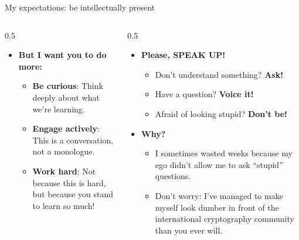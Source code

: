 \ifdefined\PRESENTATION\else\PassOptionsToClass{handout}{beamer}\fi\documentclass[aspectratio=169, lualatex]{beamer}
\begin{document}
\begin{frame}{My expectations: be intellectually present}
	\begin{columns}[c]
		\begin{column}{0.5\textwidth}
			\begin{itemize}
				\item \textbf{But I want you to do more:}
				      \begin{itemize}[<+->]
					      \item \textbf{Be curious}: Think deeply about what we're learning.
					      \item \textbf{Engage actively}: This is a conversation, not a monologue.
					      \item \textbf{Work hard}: Not because this is hard, but because you stand to learn so much!
				      \end{itemize}
			\end{itemize}
		\end{column}
		\begin{column}{0.5\textwidth}
			\begin{itemize}
				\item \textbf{Please, SPEAK UP!}
				      \begin{itemize}[<+->]
					      \item Don't understand something? \textbf{Ask!}
					      \item Have a question? \textbf{Voice it!}
					      \item Afraid of looking stupid? \textbf{Don't be!}
				      \end{itemize}
				\item \textbf{Why?}
				      \begin{itemize}[<+->]
					      \item I sometimes wasted weeks because my ego didn't allow me to ask ``stupid'' questions.
					      \item Don't worry: I've managed to make myself look dumber in front of the international cryptography community than you ever will.
				      \end{itemize}
			\end{itemize}
		\end{column}
	\end{columns}
\end{frame}
\end{document}
